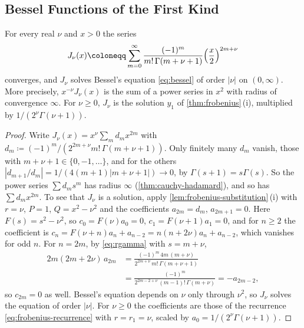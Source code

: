 \subsection{Bessel Functions of the First Kind}

\begin{theorem}
\label{thm:bessel-j}
For every real $\nu$ and $x>0$ the series
\begin{equation}
J_\nu(x)\coloneqq\sum_{m=0}^\infty\frac{(-1)^m}{m!\,\Gamma(m+\nu+1)}\Bigl(\frac x2\Bigr)^{2m+\nu}
\label{eq:bessel-j}
\end{equation}
converges, and $J_\nu$ solves Bessel's equation \eqref{eq:bessel} of order $|\nu|$ on $(0,\infty)$. More precisely, $x^{-\nu}J_\nu(x)$ is the sum of a power series in $x^2$ with radius of convergence $\infty$. For $\nu\ge0$, $J_\nu$ is the solution $y_1$ of \cref{thm:frobenius}\,(i), multiplied by $1/(2^\nu\Gamma(\nu+1))$.
\end{theorem}

\begin{proof}
Write $J_\nu(x)=x^\nu\sum_md_mx^{2m}$ with $d_m\coloneqq(-1)^m/(2^{2m+\nu}m!\,\Gamma(m+\nu+1))$. Only finitely many $d_m$ vanish, those with $m+\nu+1\in\{0,-1,\ldots\}$, and for the others $|d_{m+1}/d_m|=1/(4(m+1)|m+\nu+1|)\to0$, by $\Gamma(s+1)=s\Gamma(s)$. So the power series $\sum d_ms^m$ has radius $\infty$ (\cref{thm:cauchy-hadamard}), and so has $\sum d_mx^{2m}$. To see that $J_\nu$ is a solution, apply \cref{lem:frobenius-substitution}\,(i) with $r=\nu$, $P=1$, $Q=x^2-\nu^2$ and the coefficients $a_{2m}=d_m$, $a_{2m+1}=0$. Here $F(s)=s^2-\nu^2$, so $c_0=F(\nu)a_0=0$, $c_1=F(\nu+1)a_1=0$, and for $n\ge2$ the coefficient is $c_n=F(\nu+n)a_n+a_{n-2}=n(n+2\nu)a_n+a_{n-2}$, which vanishes for odd $n$. For $n=2m$, by \eqref{eq:rgamma} with $s=m+\nu$,
\begin{align*}
2m(2m+2\nu)\,a_{2m}&=\frac{(-1)^m\,4m\,(m+\nu)}{2^{2m+\nu}\,m!\,\Gamma(m+\nu+1)}\\
&=\frac{(-1)^m}{2^{2m-2+\nu}\,(m-1)!\,\Gamma(m+\nu)}=-a_{2m-2},
\end{align*}
so $c_{2m}=0$ as well. Bessel's equation depends on $\nu$ only through $\nu^2$, so $J_\nu$ solves the equation of order $|\nu|$. For $\nu\ge0$ the coefficients are those of the recurrence \eqref{eq:frobenius-recurrence} with $r=r_1=\nu$, scaled by $a_0=1/(2^\nu\Gamma(\nu+1))$.
\end{proof}


